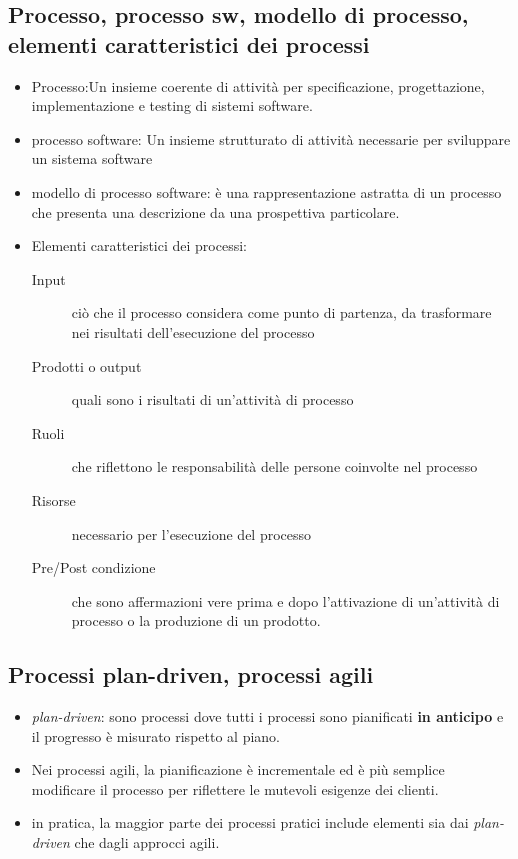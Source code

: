 \subsection{Processo, processo sw, modello di processo, elementi caratteristici dei processi}
\begin{itemize}
    \item Processo:Un insieme coerente di attività per specificazione, progettazione, implementazione e testing di sistemi software.
    \item processo software: Un insieme strutturato di attività necessarie per sviluppare un sistema software
    \item modello di processo software: è una rappresentazione astratta di un processo che presenta una descrizione da una prospettiva particolare.
    \item Elementi caratteristici dei processi:
    \begin{description}
        \item[Input] ciò che il processo considera come punto di partenza, da trasformare nei risultati dell'esecuzione del processo
        \item[Prodotti o output] quali sono i risultati di un'attività di processo
        \item[Ruoli] che riflettono le responsabilità delle persone coinvolte nel processo
        \item[Risorse] necessario per l'esecuzione del processo
        \item[Pre/Post condizione] che sono affermazioni vere prima e dopo l'attivazione di un'attività di processo o la produzione di un prodotto.
    \end{description}
\end{itemize}
\subsection{Processi plan-driven, processi agili}
\begin{itemize}
    \item \textit{plan-driven}: sono processi dove tutti i processi sono pianificati \textbf{in anticipo} e il progresso è misurato rispetto al piano.
    \item Nei processi agili, la pianificazione è incrementale ed è più semplice modificare il processo per riflettere le mutevoli esigenze dei clienti.
    \item in pratica, la maggior parte dei processi pratici include elementi sia dai \textit{plan-driven} che dagli approcci agili.
\end{itemize}
